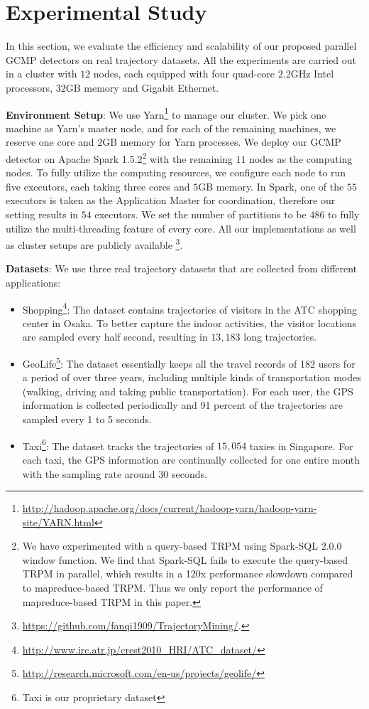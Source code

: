 \section{Experimental Study}
\label{sec:exp}
In this section, we evaluate the efficiency and scalability of our proposed parallel GCMP detectors on real trajectory datasets. All the experiments are carried out in a cluster with $12$ nodes, each equipped with four quad-core $2.2$GHz Intel processors, $32$GB memory and Gigabit Ethernet. 

\textbf{Environment Setup}: We use Yarn\footnote{\url{http://hadoop.apache.org/docs/current/hadoop-yarn/hadoop-yarn-site/YARN.html}} to manage our cluster. We pick one machine as Yarn's master node, and for each of the remaining machines, we reserve one core and $2$GB memory for Yarn processes. We deploy our GCMP detector on Apache Spark 1.5.2\footnote{We have experimented with a query-based TRPM using Spark-SQL 2.0.0 window function. 
We find that Spark-SQL fails to execute the query-based TRPM in parallel, which results in a 120x performance slowdown compared to mapreduce-based TRPM.
Thus we only report the performance of mapreduce-based TRPM in this paper.} with the remaining $11$ nodes as the computing nodes.
To fully utilize the computing resources, we configure each node to run five executors, each taking three cores and $5$GB memory. In Spark, one of the $55$ executors is taken as the Application Master for coordination, therefore our setting results in $54$ executors.  We set the number of partitions to be $486$ to fully utilize the multi-threading feature of every core.
All our implementations as well as cluster setups are publicly available%
\footnote{\url{https://github.com/fanqi1909/TrajectoryMining/}.}.

\textbf{Datasets}: We use three real trajectory datasets that are collected from different applications:
\begin{itemize}[nosep]
\item{Shopping}\footnote{\url{http://www.irc.atr.jp/crest2010_HRI/ATC_dataset/}}: The dataset contains
  trajectories of visitors in the ATC shopping center in Osaka. To better capture the indoor activities, the visitor locations are sampled every half second, resulting in $13,183$ long trajectories. 
\item{GeoLife}\footnote{\url{http://research.microsoft.com/en-us/projects/geolife/}}: The dataset essentially keeps all the travel records of 182 users for a period
of over three years, including multiple kinds of transportation modes (walking, driving and taking public
transportation). For each user, the GPS information is collected periodically and 91 percent of the trajectories
are sampled every 1 to 5 seconds.
\item{Taxi}\footnote{Taxi is our proprietary dataset}: The dataset tracks the trajectories of $15,054$ taxies in Singapore. For each taxi, the GPS information are continually collected for one entire month with the sampling rate around 30 seconds.
\end{itemize}


